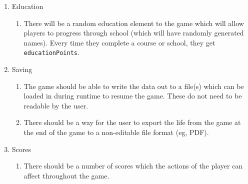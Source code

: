 \begin{enumerate}
    \item Education
    \begin{enumerate}
        \item There will be a random education element to the game which will allow players to progress through school (which will have randomly generated names). Every time they complete a course or school, they get \verb|educationPoints|. 
    \end{enumerate}
    \item Saving
    \begin{enumerate}
        \item The game should be able to write the data out to a file(s) which can be loaded in during runtime to resume the game. These do not need to be readable by the user.
        \item There should be a way for the user to export the life from the game at the end of the game to a non-editable file format (eg, PDF).
    \end{enumerate}
    \item Scores
    \begin{enumerate}
        \item There should be a number of scores which the actions of the player can affect throughout the game.
    \end{enumerate}
\end{enumerate}